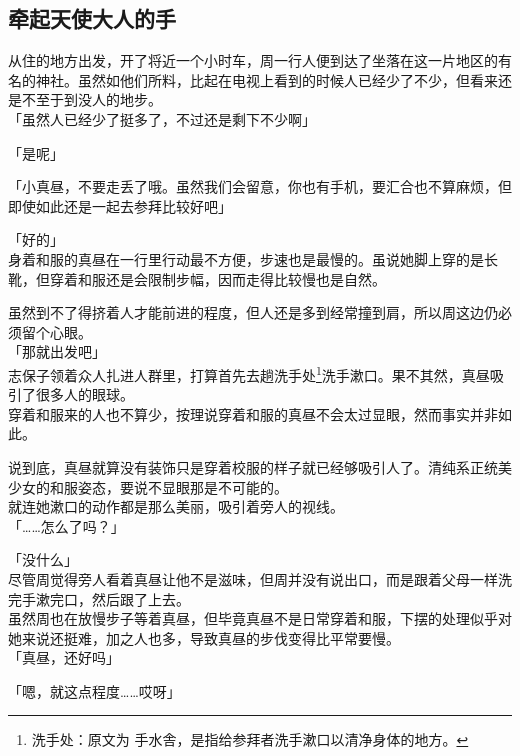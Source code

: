 \subsection{牵起天使大人的手}

从住的地方出发，开了将近一个小时车，周一行人便到达了坐落在这一片地区的有名的神社。虽然如他们所料，比起在电视上看到的时候人已经少了不少，但看来还是不至于到没人的地步。\\

「虽然人已经少了挺多了，不过还是剩下不少啊」

「是呢」

「小真昼，不要走丢了哦。虽然我们会留意，你也有手机，要汇合也不算麻烦，但即使如此还是一起去参拜比较好吧」

「好的」\\

身着和服的真昼在一行里行动最不方便，步速也是最慢的。虽说她脚上穿的是长靴，但穿着和服还是会限制步幅，因而走得比较慢也是自然。

虽然到不了得挤着人才能前进的程度，但人还是多到经常撞到肩，所以周这边仍必须留个心眼。\\

「那就出发吧」\\

志保子领着众人扎进人群里，打算首先去趟洗手处\footnote{洗手处：原文为 {\jpfont 手水舎}，是指给参拜者洗手漱口以清净身体的地方。}洗手漱口。果不其然，真昼吸引了很多人的眼球。\\

穿着和服来的人也不算少，按理说穿着和服的真昼不会太过显眼，然而事实并非如此。

说到底，真昼就算没有装饰只是穿着校服的样子就已经够吸引人了。清纯系正统美少女的和服姿态，要说不显眼那是不可能的。\\

就连她漱口的动作都是那么美丽，吸引着旁人的视线。\\

「……怎么了吗？」

「没什么」\\

尽管周觉得旁人看着真昼让他不是滋味，但周并没有说出口，而是跟着父母一样洗完手漱完口，然后跟了上去。\\

虽然周也在放慢步子等着真昼，但毕竟真昼不是日常穿着和服，下摆的处理似乎对她来说还挺难，加之人也多，导致真昼的步伐变得比平常要慢。\\

「真昼，还好吗」

「嗯，就这点程度……哎呀」\\

